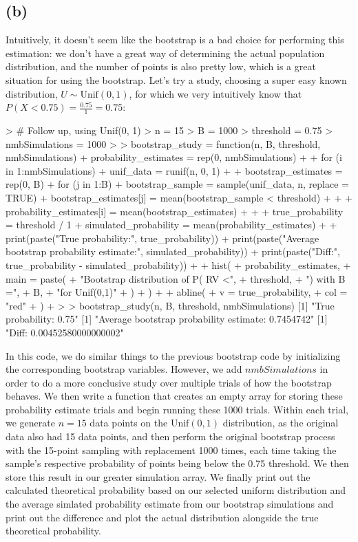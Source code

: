 \documentclass{article}
\begin{document}
{\subsection*{(b)}

Intuitively, it doesn't seem like the bootstrap is a bad choice for performing this estimation: we don't have a great way of determining the actual population distribution, and the number of points is also pretty low, which is a great situation for using the bootstrap. Let's try a study, choosing a super easy known distribution, \(U \sim \text{Unif}(0, 1)\), for which we very intuitively know that \(P(X < 0.75) = \frac{0.75}{1} = 0.75\): 
\begin{spverbatim}
> # Follow up, using Unif(0, 1)
> n = 15
> B = 1000
> threshold = 0.75
> nmbSimulations = 1000
> 
> bootstrap_study = function(n, B, threshold, nmbSimulations) {
+   probability_estimates = rep(0, nmbSimulations)
+   
+   for (i in 1:nmbSimulations) {
+     unif_data = runif(n, 0, 1)
+     
+     bootstrap_estimates = rep(0, B)
+     for (j in 1:B) {
+       bootstrap_sample = sample(unif_data, n, replace = TRUE)
+       bootstrap_estimates[j] = mean(bootstrap_sample < threshold)
+     }
+     
+     probability_estimates[i] = mean(bootstrap_estimates)
+   }
+   
+   true_probability = threshold / 1
+   simulated_probability = mean(probability_estimates)
+   
+   print(paste("True probability:", true_probability))
+   print(paste("Average bootstrap probability estimate:", simulated_probability))
+   print(paste("Diff:", true_probability - simulated_probability))
+   
+   hist(
+     probability_estimates,
+     main = paste(
+       "Bootstrap distribution of P( RV <",
+       threshold,
+       ") with B =",
+       B,
+       "for Unif(0,1)"
+     )
+   )
+   
+   abline(
+     v = true_probability,
+     col = "red"
+   )
+ }
> 
> bootstrap_study(n, B, threshold, nmbSimulations)
[1] "True probability: 0.75"
[1] "Average bootstrap probability estimate: 0.7454742"
[1] "Diff: 0.00452580000000002"
\end{spverbatim}
In this code, we do similar things to the previous bootstrap code by initializing the corresponding bootstrap variables. However, we add \(nmbSimulations\) in order to do a more conclusive study over multiple trials of how the bootstrap behaves. We then write a function that creates an empty array for storing these probability estimate trials and begin running these 1000 trials. Within each trial, we generate \(n = 15\) data points on the \(\text{Unif}(0,1)\) distribution, as the original data also had 15 data points, and then perform the original bootstrap process with the 15-point sampling with replacement 1000 times, each time taking the sample's respective probability of points being below the 0.75 threshold. We then store this result in our greater simulation array. We finally print out the calculated theoretical probability based on our selected uniform distribution and the average simlated probability estimate from our bootstrap simulations and print out the difference and plot the actual distribution alongside the true theoretical probability.
}
\end{document}

